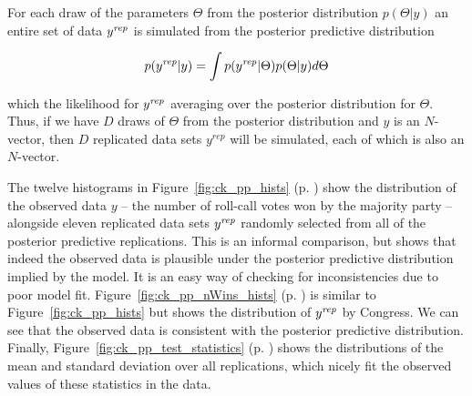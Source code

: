 For each draw of the parameters $\Theta$ from the posterior distribution $p(\Theta | y)$ an entire set of data $y^{\it rep} $ is simulated from the posterior predictive distribution

\begin{equation*}
 p(y^{\it rep} | y) = \int p(y^{\it rep} | \Theta) p(\Theta | y) d\Theta
\end{equation*}

\noindent which the likelihood for $y^{\it rep}$ averaging over the posterior distribution for $\Theta$. Thus, if we have $D$ draws of $\Theta$ from the posterior distribution and $y$ is an $N$-vector, then $D$ replicated data sets $y^{rep}$ will be simulated, each of which is also an $N$-vector.

The twelve histograms in Figure~\ref{fig:ck_pp_hists} (p. \pageref{fig:ck_pp_hists}) show the distribution of the observed data $y$ -- the number of roll-call votes won by the majority party -- alongside eleven replicated data sets $y^{\it rep}$ randomly selected from all of the posterior predictive replications. This is an informal comparison, but shows that indeed the observed data is plausible under the posterior predictive distribution implied by the model. It is an easy way of checking for inconsistencies due to poor model fit. Figure~\ref{fig:ck_pp_nWins_hists} (p. \pageref{fig:ck_pp_nWins_hists}) is similar to Figure~\ref{fig:ck_pp_hists} but shows the distribution of $y^{\it rep}$ by Congress. We can see that the observed data is consistent with the posterior predictive distribution. Finally, Figure~\ref{fig:ck_pp_test_statistics} (p. \pageref{fig:ck_pp_test_statistics}) shows the distributions of the mean and standard deviation over all replications, which nicely fit the observed values of these statistics in the data. 


